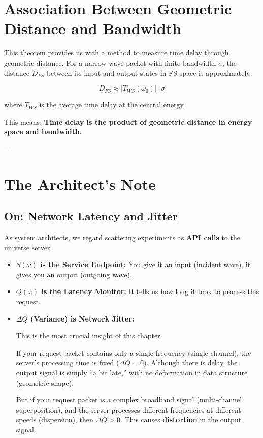 \documentclass[11pt,a4paper,twoside]{book}
\begin{document}
\section{Association Between Geometric Distance and Bandwidth}

This theorem provides us with a method to measure time delay through geometric distance. For a narrow wave packet with finite bandwidth $\sigma$, the distance $D_{FS}$ between its input and output states in FS space is approximately:

$$D_{FS} \approx |T_{WS}(\omega_0)| \cdot \sigma$$

where $T_{WS}$ is the average time delay at the central energy.

This means: \textbf{Time delay is the product of geometric distance in energy space and bandwidth.}

---

\section{The Architect's Note}

\subsection{On: Network Latency and Jitter}

As system architects, we regard scattering experiments as \textbf{API calls} to the universe server.

\begin{itemize}
\item \textbf{$S(\omega)$ is the Service Endpoint:} You give it an input (incident wave), it gives you an output (outgoing wave).

\item \textbf{$Q(\omega)$ is the Latency Monitor:} It tells us how long it took to process this request.

\item \textbf{$\Delta Q$ (Variance) is Network Jitter:}

    This is the most crucial insight of this chapter.

    If your request packet contains only a single frequency (single channel), the server's processing time is fixed ($\Delta Q=0$). Although there is delay, the output signal is simply ``a bit late,'' with no deformation in data structure (geometric shape).

    But if your request packet is a complex broadband signal (multi-channel superposition), and the server processes different frequencies at different speeds (dispersion), then $\Delta Q > 0$. This causes \textbf{distortion} in the output signal.
\end{itemize}
\end{document}
